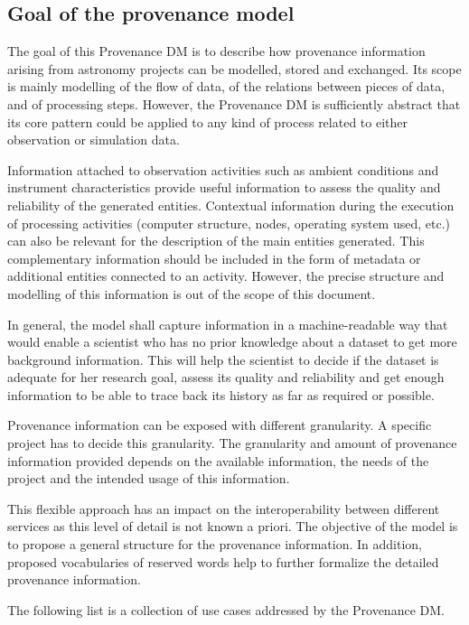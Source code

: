 \subsection{Goal of the provenance model}
\label{sec:goals}

The goal of this Provenance DM is to describe how provenance information arising from astronomy projects can be modelled, stored and exchanged. 
Its scope is mainly modelling of the flow of data, of the relations between pieces of data, and of processing steps. 
However, the Provenance DM is sufficiently abstract that its core pattern could be applied to any kind of process related to either observation or simulation data.

Information attached to observation activities such as ambient conditions and instrument characteristics provide useful information to assess the quality and reliability of the generated entities.
Contextual information during the execution of processing activities (computer structure, nodes, operating system used, etc.) can also be relevant for the description of the main entities generated. 
This complementary information should be included in the form of metadata or additional entities connected to an activity. 
However, the precise structure and modelling of this information is out of the scope of this document. 

In general, the model shall capture information in a machine-readable way that would enable a scientist who has no prior knowledge about a dataset to get more background information. 
This will help the scientist to decide if the dataset is adequate for her research goal, assess its quality and reliability and get enough information to be able to trace back its history as far as required or possible. 

Provenance information can be exposed with different granularity. A specific project has to decide this granularity.
The granularity and amount of provenance information provided depends on the available information, the needs of the project and the intended usage of this information.

This flexible approach has an impact on the interoperability between different services as this level of detail is not known a priori. 
The objective of the model is to propose a general structure for the provenance information. In addition, proposed vocabularies of reserved words help to further formalize the detailed provenance information.


The following list is a collection of use cases addressed by the Provenance DM. 


